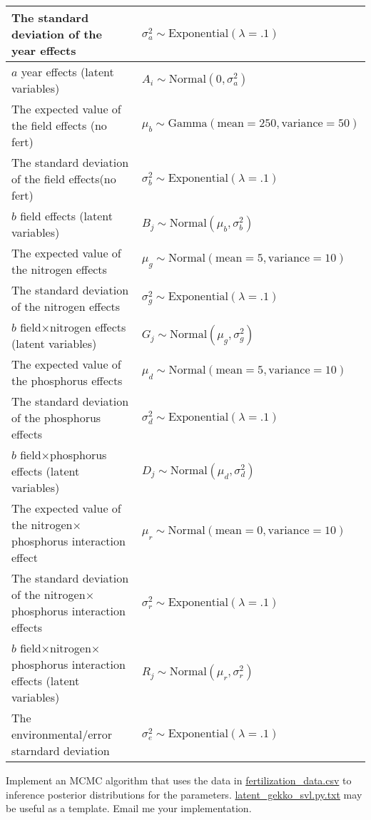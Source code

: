 \documentclass[11pt]{article}
\begin{document}
\begin{compactenum}
{\begin{center}
\begin{tabular}{|p{9cm}l|}
\hline
The standard deviation of the year effects &  $\sigma_a^2 \sim \mbox{Exponential}(\lambda=.1)$ \\
\hline
$a$ year effects (latent variables)&  $A_i\sim \mbox{Normal}(0, \sigma_a^2)$\\
\hline
The expected value of the field effects (no fert)&  $\mu_b \sim \mbox{Gamma}(\mbox{mean}=250, \mbox{variance}=50)$\\
\hline
The standard deviation of the field effects(no fert) &  $\sigma_b^2 \sim \mbox{Exponential}(\lambda=.1)$\\
\hline
$b$ field effects (latent variables)&  $B_j\sim \mbox{Normal}(\mu_b, \sigma_b^2)$\\
\hline
The expected value of the nitrogen effects&  $\mu_g \sim \mbox{Normal}(\mbox{mean}=5, \mbox{variance}=10)$\\
\hline
The standard deviation of the nitrogen effects&  $\sigma_g^2 \sim \mbox{Exponential}(\lambda=.1)$\\
\hline
$b$ field$\times$nitrogen effects (latent variables)&  $G_j\sim \mbox{Normal}(\mu_g, \sigma_g^2)$\\
\hline
The expected value of the phosphorus effects&  $\mu_d \sim \mbox{Normal}(\mbox{mean}=5, \mbox{variance}=10)$\\
\hline
The standard deviation of the phosphorus effects&  $\sigma_d^2 \sim \mbox{Exponential}(\lambda=.1)$\\
\hline
$b$ field$\times$phosphorus effects (latent variables)&  $D_j\sim \mbox{Normal}(\mu_d, \sigma_d^2)$\\
\hline
The expected value of the nitrogen$\times$phosphorus interaction effect&  $\mu_r \sim \mbox{Normal}(\mbox{mean}=0, \mbox{variance}=10)$\\
\hline
The standard deviation of the nitrogen$\times$phosphorus interaction effects&  $\sigma_r^2 \sim \mbox{Exponential}(\lambda=.1)$\\
\hline
$b$ field$\times$nitrogen$\times$phosphorus interaction effects (latent variables)&  $R_j\sim \mbox{Normal}(\mu_r, \sigma_r^2)$\\
\hline
The environmental/error starndard deviation&  $\sigma_e^2\sim \mbox{Exponential}(\lambda=.1)$\\
\hline
\end{tabular}
\end{center}
\label{default}
	}
	\item Implement an MCMC algorithm that uses the data in \href{http://phylo.bio.ku.edu/slides/fertilization_data.csv}{fertilization\_data.csv} to inference posterior distributions for the parameters. \href{http://phylo.bio.ku.edu/slides/latent_gekko_svl.py.txt}{latent\_gekko\_svl.py.txt} may be useful as a template. Email me your implementation.

\end{compactenum}
\end{document}
